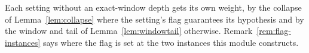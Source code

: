 
Each setting without an exact-window depth gets its own weight, by the
collapse of Lemma~\ref{lem:collapse} where the setting's flag guarantees its hypothesis
and by the window and tail of Lemma~\ref{lem:windowtail} otherwise.
Remark~\ref{rem:flag-instances} says where the flag is set at the two
instances this module constructs.

